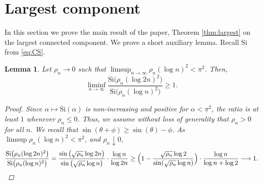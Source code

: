\documentclass[a4paper, a4wide, 10pt, reqno]{amsart}
\theoremstyle{plain}
\newtheorem{lemma}[theorem]{Lemma}
\theoremstyle{definition}
\numberwithin{equation}{section}
\newcommand{\Si}{{\mathrm{Si}}}
\begin{document}
\section{Largest component}\label{sec:largest}
In this section we prove the main result of the paper, Theorem \ref{thm:largest} on the largest connected component. We prove a short auxiliary lemma. Recall $\Si$ from \eqref{eq:CS}.
\begin{lemma}\label{lemma:si-log2}
    Let $\rho_n\to0$ such that $\limsup_{n\to\infty}\rho_n(\log n)^2<\pi^2$. Then, 
    \[
    \liminf_{n\to\infty}\frac{\Si\big(\rho_n(\log 2n)^2\big)}{\Si\big(\rho_n(\log n)^2\big)}\ge 1.
    \]
    \begin{proof}
        Since $\alpha\mapsto\Si(\alpha)$ is non-increasing and positive for $\alpha<\pi^2$, the ratio is at least $1$ whenever $\rho_n\le 0$. Thus, we assume without loss of generality that $\rho_n>0$ for all $n$. We recall that $\sin(\theta+\phi)\ge\sin(\theta)-\phi$. As $\limsup\rho_n(\log n)^2<\pi^2$, and $\rho_n\downarrow 0$,
        \[
        \frac{\Si\big(\rho_n(\log 2n)^2\big)}{\Si\big(\rho_n(\log n)^2\big)} = \frac{\sin\big(\sqrt{\rho_n}\log 2n\big)}{\sin\big(\sqrt{\rho_n}\log n\big)}\cdot\frac{\log n}{\log2n}
        \ge\Big(1- \frac{\sqrt{\rho_n}\log 2}{\sin(\sqrt{\rho_n}\log n)}\Big)\cdot\frac{\log n}{\log n + \log 2}\longrightarrow1. \qedhere
        \]
    \end{proof}
\end{lemma}
\end{document}
